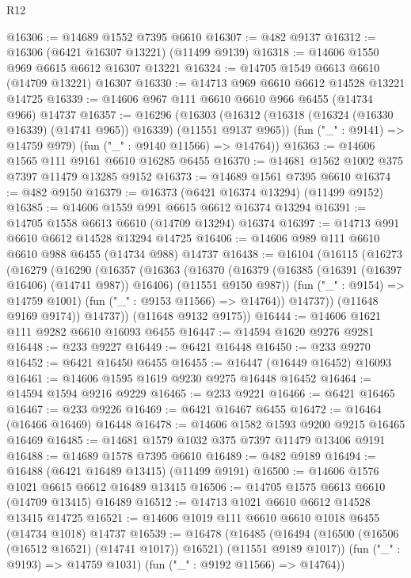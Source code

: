 \begin{lexlean}{R12}
\begin{coremodule}
@16306 := @14689 @1552 @7395 @6610
@16307 := @482 @9137
@16312 := @16306 (@6421 @16307 @13221) (@11499 @9139)
@16318 := @14606 @1550 @969 @6615 @6612 @16307 @13221
@16324 := @14705 @1549 @6613 @6610 (@14709 @13221) @16307
@16330 := @14713 @969 @6610 @6612 @14528 @13221 @14725
@16339 := @14606 @967 @111 @6610 @6610 @966 @6455 (@14734 @966) @14737
@16357 := @16296
    (@16303
      (@16312 (@16318 (@16324 (@16330 @16339) (@14741 @965)) @16339) (@11551 @9137 @965))
      (fun ("_" : @9141) => @14759 @979)
      (fun ("_" : @9140 @11566) => @14764))
@16363 := @14606 @1565 @111 @9161 @6610 @16285 @6455
@16370 := @14681 @1562 @1002 @375 @7397 @11479 @13285 @9152
@16373 := @14689 @1561 @7395 @6610
@16374 := @482 @9150
@16379 := @16373 (@6421 @16374 @13294) (@11499 @9152)
@16385 := @14606 @1559 @991 @6615 @6612 @16374 @13294
@16391 := @14705 @1558 @6613 @6610 (@14709 @13294) @16374
@16397 := @14713 @991 @6610 @6612 @14528 @13294 @14725
@16406 := @14606 @989 @111 @6610 @6610 @988 @6455 (@14734 @988) @14737
@16438 := @16104
    (@16115
      (@16273
        (@16279
          (@16290
            (@16357
              (@16363
                (@16370
                  (@16379
                    (@16385 (@16391 (@16397 @16406) (@14741 @987)) @16406)
                    (@11551 @9150 @987))
                  (fun ("_" : @9154) => @14759 @1001)
                  (fun ("_" : @9153 @11566) => @14764))
                @14737))
            (@11648 @9169 @9174))
          @14737))
      (@11648 @9132 @9175))
@16444 := @14606 @1621 @111 @9282 @6610 @16093 @6455
@16447 := @14594 @1620 @9276 @9281
@16448 := @233 @9227
@16449 := @6421 @16448
@16450 := @233 @9270
@16452 := @6421 @16450 @6455
@16455 := @16447 (@16449 @16452) @16093
@16461 := @14606 @1595 @1619 @9230 @9275 @16448 @16452
@16464 := @14594 @1594 @9216 @9229
@16465 := @233 @9221
@16466 := @6421 @16465
@16467 := @233 @9226
@16469 := @6421 @16467 @6455
@16472 := @16464 (@16466 @16469) @16448
@16478 := @14606 @1582 @1593 @9200 @9215 @16465 @16469
@16485 := @14681 @1579 @1032 @375 @7397 @11479 @13406 @9191
@16488 := @14689 @1578 @7395 @6610
@16489 := @482 @9189
@16494 := @16488 (@6421 @16489 @13415) (@11499 @9191)
@16500 := @14606 @1576 @1021 @6615 @6612 @16489 @13415
@16506 := @14705 @1575 @6613 @6610 (@14709 @13415) @16489
@16512 := @14713 @1021 @6610 @6612 @14528 @13415 @14725
@16521 := @14606 @1019 @111 @6610 @6610 @1018 @6455 (@14734 @1018) @14737
@16539 := @16478
    (@16485
      (@16494 (@16500 (@16506 (@16512 @16521) (@14741 @1017)) @16521) (@11551 @9189 @1017))
      (fun ("_" : @9193) => @14759 @1031)
      (fun ("_" : @9192 @11566) => @14764))

\end{coremodule}
\end{lexlean}
